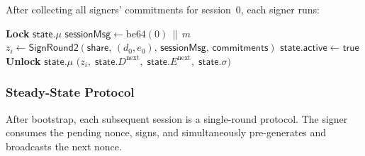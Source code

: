 \documentclass[11pt,a4paper]{article}
\newcommand{\id}{\mathsf{id}}
\begin{document}
After collecting all signers' commitments for session~0, each signer runs:

\begin{algorithm}[H]
\caption{$\mathsf{BootstrapRound2}(\mathsf{share},\, \mathsf{state},\,
  (d_0, e_0),\, m,\, \{(\id_j, D_j, E_j)\}_{j \in \mathcal{S}})$}
\label{alg:bootstrap-r2}
\begin{algorithmic}[1]
\State \textbf{Lock} $\mathsf{state}.\mu$
\State $\mathsf{sessionMsg} \leftarrow \mathrm{be64}(0) \,\|\, m$
\State $z_i \leftarrow \mathsf{SignRound2}(\mathsf{share},\, (d_0, e_0),\,
  \mathsf{sessionMsg},\, \mathsf{commitments})$
\State $\mathsf{state}.\mathsf{active} \leftarrow \mathsf{true}$
\State \textbf{Unlock} $\mathsf{state}.\mu$
\State \Return $\bigl(z_i,\; \mathsf{state}.D^{\mathrm{next}},\;
  \mathsf{state}.E^{\mathrm{next}},\; \mathsf{state}.\sigma\bigr)$
\end{algorithmic}
\end{algorithm}

\subsubsection{Steady-State Protocol}
\label{sec:piggyback-steady}

After bootstrap, each subsequent session is a single-round protocol.  The
signer consumes the pending nonce, signs, and simultaneously pre-generates and
broadcasts the next nonce.
\end{document}
